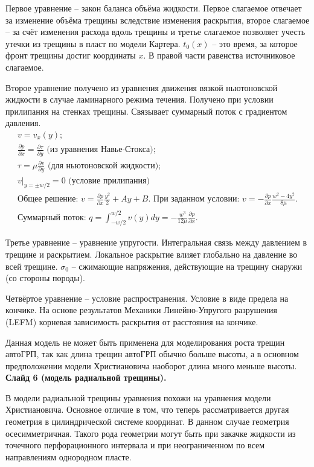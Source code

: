 \documentclass[a4paper, 12pt]{article}
\newcommand{\beq}{\begin{equation}}
\newcommand{\eeq}{\end{equation}}
\begin{document}
Первое уравнение -- закон баланса объёма жидкости.
Первое слагаемое отвечает за изменение объёма трещины вследствие изменения раскрытия, второе слагаемое -- за счёт изменения расхода вдоль трещины и третье слагаемое позволяет учесть утечки из трещины в пласт по модели Картера.
$t_0(x)$ -- это время, за которое фронт трещины достиг координаты $x$.
В правой части равенства источниковое слагаемое.

Второе уравнение получено из уравнения движения вязкой ньютоновской жидкости в случае ламинарного режима течения.
Получено при условии прилипания на стенках трещины.
Связывает суммарный поток с градиентом давления.
\beq
\begin{gathered}
v=v_x(y);\\
\frac{\partial p}{\partial x}=\frac{\partial\tau}{\partial y}\text{ (из уравнения Навье-Стокса)};\\
\tau=\mu\frac{\partial v}{\partial y}\text{ (для ньютоновской жидкости)};\\
v|_{y=\pm w/2}=0\text{ (условие прилипания)}\\
\text{Общее решение: }v=\frac{\partial p}{\partial x}\frac{y^2}{2}+Ay+B.\text{ При заданном условии: }v=-\frac{\partial p}{\partial x}\frac{w^2-4y^2}{8\mu}.\\
\text{Суммарный поток: }q=\int_{-w/2}^{w/2}{v(y)}dy=-\frac{w^3}{12\mu}\frac{\partial p}{\partial x}.
\end{gathered}
\eeq


Третье уравнение -- уравнение упругости.
Интегральная связь между давлением в трещине и раскрытием.
Локальное раскрытие влияет глобально на давление во всей трещине.
$\sigma_0$ -- сжимающие напряжения, действующие на трещину снаружи (со стороны породы).

Четвёртое уравнение -- условие распространения.
Условие в виде предела на кончике.
На основе результатов Механики Линейно-Упругого разрушения (LEFM) корневая зависимость раскрытия от расстояния на кончике.

Данная модель не может быть применена для моделирования роста трещин автоГРП, так как длина трещин автоГРП обычно больше высоты, а в основном предположении модели Христиановича наоборот длина много меньше высоты.\\

\textbf{Слайд 6 (модель радиальной трещины).}

В модели радиальной трещины уравнения похожи на уравнения модели Христиановича.
Основное отличие в том, что теперь рассматривается другая геометрия в цилиндрической системе координат.
В данном случае геометрия осесимметричная.
Такого рода геометрии могут быть при закачке жидкости из точечного перфорационного интервала и при неограниченном по всем направлениям однородном пласте.
\end{document}
